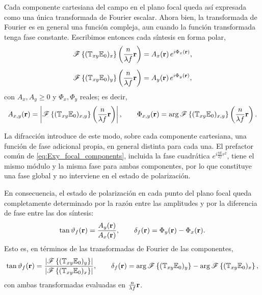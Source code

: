 Cada componente cartesiana del campo en el plano focal queda así expresada
como una única transformada de Fourier escalar. Ahora bien, la transformada de
Fourier es en general una función compleja, aun cuando la función transformada
tenga fase constante. Escribimos entonces cada síntesis en forma polar,
\begin{equation}
\begin{aligned}
\mathscr F\left\{(\mathbb{T}_{xy}\mathbb E_0)_x\right\}
\left(\frac{n}{\lambda f}\vb r\right)
&=
A_x(\vb r)\,e^{i\Phi_x(\vb r)},
\\[0.5em]
\mathscr F\left\{(\mathbb{T}_{xy}\mathbb E_0)_y\right\}
\left(\frac{n}{\lambda f}\vb r\right)
&=
A_y(\vb r)\,e^{i\Phi_y(\vb r)},
\end{aligned}
\label{eq:fourier_polar_form}
\end{equation}
con $A_x,A_y\geq 0$ y $\Phi_x,\Phi_y$ reales; es decir,
\begin{equation}
A_{x,y}(\vb r)
=
\left|
\mathscr F
\left\{
(\mathbb{T}_{xy}\mathbb E_0)_{x,y}
\right\}
\left(\frac{n}{\lambda f}\vb r\right)
\right|,
\qquad
\Phi_{x,y}(\vb r)
=
\arg
\mathscr F
\left\{
(\mathbb{T}_{xy}\mathbb E_0)_{x,y}
\right\}
\left(\frac{n}{\lambda f}\vb r\right).
\label{eq:Axy_Phixy_def}
\end{equation}

La difracción introduce de este modo, sobre cada componente cartesiana, una
función de fase adicional propia, en general distinta para cada una. El
prefactor común de \eqref{eq:Exy_focal_components}, incluida la fase
cuadrática $e^{i\frac{nk}{2f}r^2}$, tiene el mismo módulo y la misma fase para
ambas componentes, por lo que constituye una fase global y no interviene en el
estado de polarización.

En consecuencia, el estado de polarización en cada punto del plano focal queda
completamente determinado por la razón entre las amplitudes y por la
diferencia de fase entre las dos síntesis:
\begin{equation}
\tan \vartheta_f(\vb r)
=
\frac{A_y(\vb r)}{A_x(\vb r)},
\qquad
\delta_f(\vb r)
=
\Phi_y(\vb r)-\Phi_x(\vb r).
\label{eq:theta_delta_focal}
\end{equation}
Esto es, en términos de las transformadas de Fourier de las componentes,
\begin{equation}
\tan \vartheta_f(\vb r)
=
\frac{
\left|
\mathscr F
\left\{
(\mathbb{T}_{xy}\mathbb E_0)_y
\right\}
\right|
}{
\left|
\mathscr F
\left\{
(\mathbb{T}_{xy}\mathbb E_0)_x
\right\}
\right|
},
\qquad
\delta_f(\vb r)
=
\arg
\mathscr F
\left\{
(\mathbb{T}_{xy}\mathbb E_0)_y
\right\}
-
\arg
\mathscr F
\left\{
(\mathbb{T}_{xy}\mathbb E_0)_x
\right\},
\label{eq:theta_delta_focal_explicit}
\end{equation}
con ambas transformadas evaluadas en $\frac{n}{\lambda f}\vb r$.

